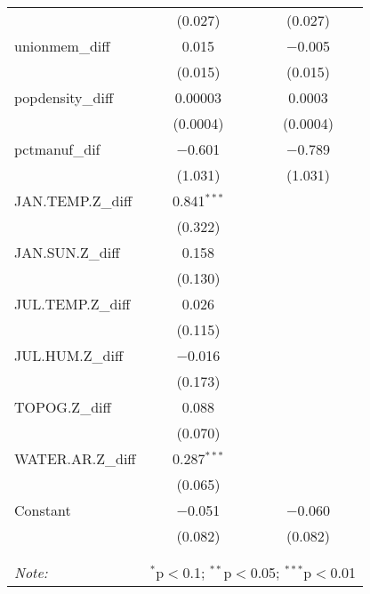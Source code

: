 \begin{table}[!htbp]
\begin{tabular}{@{\extracolsep{5pt}}lcc}
  & (0.027) & (0.027) \\ 
  unionmem\_diff & 0.015 & $-$0.005 \\ 
  & (0.015) & (0.015) \\ 
  popdensity\_diff & 0.00003 & 0.0003 \\ 
  & (0.0004) & (0.0004) \\ 
  pctmanuf\_dif & $-$0.601 & $-$0.789 \\ 
  & (1.031) & (1.031) \\ 
  JAN.TEMP.Z\_diff & 0.841$^{***}$ &  \\ 
  & (0.322) &  \\ 
  JAN.SUN.Z\_diff & 0.158 &  \\ 
  & (0.130) &  \\ 
  JUL.TEMP.Z\_diff & 0.026 &  \\ 
  & (0.115) &  \\ 
  JUL.HUM.Z\_diff & $-$0.016 &  \\ 
  & (0.173) &  \\ 
  TOPOG.Z\_diff & 0.088 &  \\ 
  & (0.070) &  \\ 
  WATER.AR.Z\_diff & 0.287$^{***}$ &  \\ 
  & (0.065) &  \\ 
  Constant & $-$0.051 & $-$0.060 \\ 
  & (0.082) & (0.082) \\ 
 \hline \\[-1.8ex] 
\hline 
\hline \\[-1.8ex] 
\textit{Note:}  & \multicolumn{2}{r}{$^{*}$p$<$0.1; $^{**}$p$<$0.05; $^{***}$p$<$0.01} \\ 
\end{tabular} 
\end{table} 
